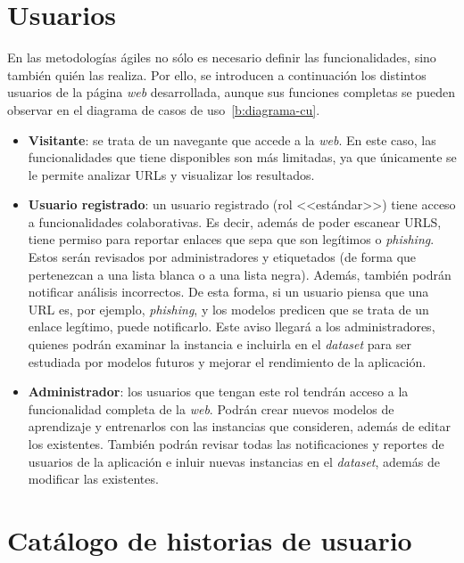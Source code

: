 \section{Usuarios}
\label{s:usuarios}

En las metodologías ágiles no sólo es necesario definir las funcionalidades, sino también quién las realiza. Por ello, se introducen a continuación los distintos usuarios de la página \textit{web} desarrollada, aunque sus funciones completas se pueden observar en el diagrama de casos de uso~\ref{b:diagrama-cu}.

\begin{itemize}
	\item \textbf{Visitante}: se trata de un navegante que accede a la \textit{web}. En este caso, las funcionalidades que tiene disponibles son más limitadas, ya que únicamente se le permite analizar URLs y visualizar los resultados.
	\item \textbf{Usuario registrado}: un usuario registrado (rol <<estándar>>) tiene acceso a funcionalidades colaborativas. Es decir, además de poder escanear URLS, tiene permiso para reportar enlaces que sepa que son legítimos o \textit{phishing}. Estos serán revisados por administradores y etiquetados (de forma que pertenezcan a una lista blanca o a una lista negra). Además, también podrán notificar análisis incorrectos. De esta forma, si un usuario piensa que una URL es, por ejemplo, \textit{phishing}, y los modelos predicen que se trata de un enlace legítimo, puede notificarlo. Este aviso llegará a los administradores, quienes podrán examinar la instancia e incluirla en el \textit{dataset} para ser estudiada por modelos futuros y mejorar el rendimiento de la aplicación.
	\item \textbf{Administrador}: los usuarios que tengan este rol tendrán acceso a la funcionalidad completa de la \textit{web}. Podrán crear nuevos modelos de aprendizaje y entrenarlos con las instancias que consideren, además de editar los existentes. También podrán revisar todas las notificaciones y reportes de usuarios de la aplicación e inluir nuevas instancias en el \textit{dataset}, además de modificar las existentes.
\end{itemize}

\section{Catálogo de historias de usuario}
\label{s:hu}

